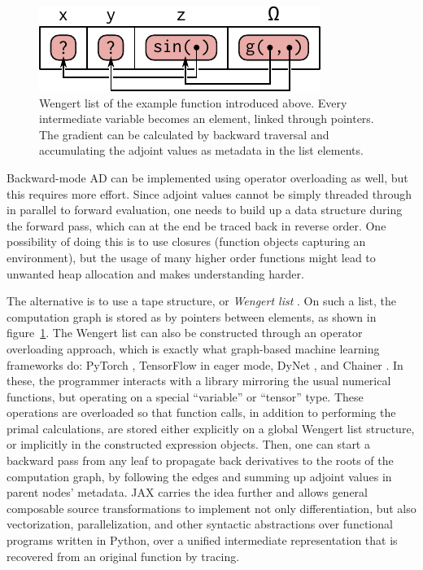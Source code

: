 \begin{figure}[t]
  \centering
  \includegraphics{figures/wengert-list}
  \caption{Wengert list of the example function \protect{} introduced above.
    Every intermediate variable becomes an element, linked through pointers.  The gradient can be
    calculated by backward traversal and accumulating the adjoint values as metadata in the list
    elements.}
  \label{fig:wengert-list}
\end{figure}

Backward-mode AD can be implemented using operator overloading as well, but this requires more
effort.  Since adjoint values cannot be simply threaded through in parallel to forward evaluation,
one needs to build up a data structure during the forward pass, which can at the end be traced back
in reverse order.  One possibility of doing this is to use closures (function objects capturing an
environment), but the usage of many higher order functions might lead to unwanted heap allocation
and makes understanding harder.

The alternative is to use a tape structure, or \emph{Wengert list} \parencites[][section
3]{baydin2018automatic}.  On such a list, the computation graph is stored as by pointers between
elements, as shown in figure~\ref{fig:wengert-list}.  The Wengert list can also be constructed
through an operator overloading approach, which is exactly what graph-based machine learning
frameworks do: PyTorch \parencite{paszke2017automatic}, TensorFlow \parencite{abadi2015tensorflow}
in eager mode, DyNet \parencite{neubig2017dynet}, and Chainer \parencite{tokui2015chainer}.  In
these, the programmer interacts with a library mirroring the usual numerical functions, but
operating on a special \enquote{variable} or \enquote{tensor} type.  These operations are overloaded
so that function calls, in addition to performing the primal calculations, are stored either
explicitly on a global Wengert list structure, or implicitly in the constructed expression objects.
Then, one can start a backward pass from any leaf to propagate back derivatives to the roots of the
computation graph, by following the edges and summing up adjoint values in parent nodes' metadata.
JAX \parencite{bradbury2018jax} carries the idea further and allows general composable source
transformations to implement not only differentiation, but also vectorization, parallelization, and
other syntactic abstractions over functional programs written in Python, over a unified intermediate
representation that is recovered from an original function by tracing.

